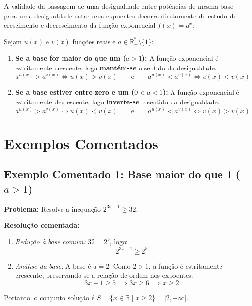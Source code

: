\documentclass[12pt,a4paper]{report}
\begin{document}
	A validade da passagem de uma desigualdade entre potências de mesma base para uma desigualdade entre seus expoentes decorre diretamente do estudo do crescimento e decrescimento da função exponencial $f(x) = a^x$:
	
	\begin{destaque}
		Sejam $u(x)$ e $v(x)$ funções reais e $a \in \mathbb{R}^*_+ \setminus \{1\}$:
		\begin{enumerate}
			\item \textbf{Se a base for maior do que um ($a > 1$):} A função exponencial é estritamente crescente, logo \textbf{mantém-se} o sentido da desigualdade:
			\[
			a^{u(x)} > a^{v(x)} \iff u(x) > v(x) \qquad \text{e} \qquad a^{u(x)} < a^{v(x)} \iff u(x) < v(x)
			\]
			\item \textbf{Se a base estiver entre zero e um ($0 < a < 1$):} A função exponencial é estritamente decrescente, logo \textbf{inverte-se} o sentido da desigualdade:
			\[
			a^{u(x)} > a^{v(x)} \iff u(x) < v(x) \qquad \text{e} \qquad a^{u(x)} < a^{v(x)} \iff u(x) > v(x)
			\]
		\end{enumerate}
	\end{destaque}
	
	\section{Exemplos Comentados}
	\label{subsec:exemplos_inequacoes}
	
	\subsection*{Exemplo Comentado 1: Base maior do que $1$ ($a > 1$)}
	
	\textbf{Problema:} Resolva a inequação $2^{3x - 1} \geqslant 32$.
	
	\textbf{Resolução comentada:}
	\begin{enumerate}[label=\alph*)]
		\item \textit{Redução à base comum:} $32 = 2^5$, logo:
		\[
		2^{3x - 1} \geqslant 2^5
		\]
		\item \textit{Análise da base:} A base é $a = 2$. Como $2 > 1$, a função é estritamente crescente, preservando-se a relação de ordem nos expoentes:
		\[
		3x - 1 \geqslant 5 \implies 3x \geqslant 6 \implies x \geqslant 2
		\]
	\end{enumerate}
	Portanto, o conjunto solução é $S = \{x \in \mathbb{R} \mid x \geqslant 2\} = [2, +\infty[$.
	
\end{document}
